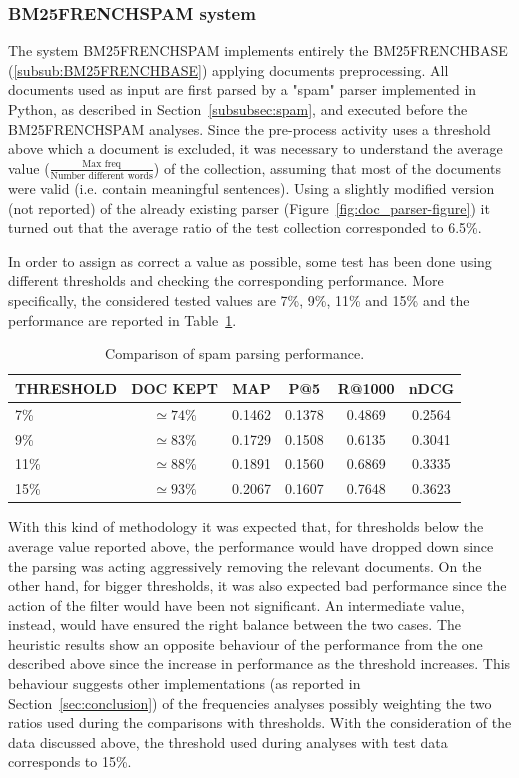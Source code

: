 \subsubsection{BM25FRENCHSPAM system}
\label{subsub:BM25FRENCHSPAM}
The system BM25FRENCHSPAM implements entirely the BM25FRENCHBASE (\ref{subsub:BM25FRENCHBASE}) applying documents preprocessing. All documents used as input are first parsed by a "spam" parser implemented in Python, as described in Section~\ref{subsubsec:spam}, and executed before the BM25FRENCHSPAM analyses. Since the pre-process activity uses a threshold above which a document is excluded, it was necessary to understand the average value (\(\frac{\text{Max freq}}{\text{Number different words}}\)) of the collection, assuming that most of the documents were valid (i.e. contain meaningful sentences). Using a slightly modified version (not reported) of the already existing parser (Figure~\ref{fig:doc_parser-figure}) it turned out that the average ratio of the test collection corresponded to 6.5\%. 
\par
In order to assign as correct a value as possible, some test has been done using different thresholds and checking the corresponding performance.  More specifically, the considered tested values are 7\%, 9\%, 11\% and 15\% and the performance are reported in Table~\ref{tab:spamparsingperf}.
\begin{center}
\begin{table}[tb]
\centering
\begin{tabular}{|l|c|c|c|c|c|} 
 \hline
   THRESHOLD & DOC KEPT & MAP & P@5 & R@1000 & nDCG\\
 \hline\hline
 7\% & \(\simeq 74\%\) & 0.1462 & 0.1378 & 0.4869 & 0.2564\\ 
 9\% & \(\simeq 83\%\) & 0.1729 & 0.1508 & 0.6135 & 0.3041\\
 11\% & \(\simeq 88\%\) & 0.1891 & 0.1560 & 0.6869 & 0.3335\\
 15\% & \(\simeq 93\%\) & 0.2067 & 0.1607 & 0.7648 & 0.3623\\ 
 \hline
\end{tabular}
\caption{Comparison of spam parsing performance.}
\label{tab:spamparsingperf}
\end{table}
\end{center}
\par
With this kind of methodology it was expected that, for thresholds below the average value reported above, the performance would have dropped down since the parsing was acting aggressively removing the relevant documents. On the other hand, for bigger thresholds, it was also expected bad performance since the action of the filter would have been not significant. An intermediate value, instead, would have ensured the right balance between the two cases. The heuristic results show an opposite behaviour  of the performance from the one described above since the increase in performance as the threshold increases. This behaviour suggests other implementations (as reported in Section~\ref{sec:conclusion}) of the frequencies analyses possibly weighting the two ratios used during the comparisons with thresholds. With the consideration of the data discussed above, the threshold used during analyses with test data corresponds to 15\%.    

